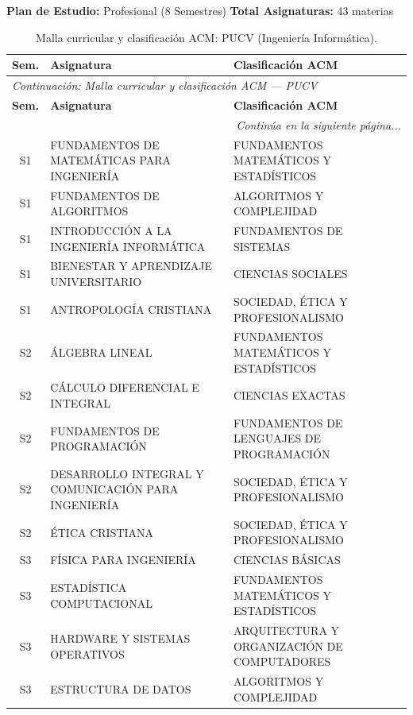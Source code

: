\documentclass[11pt,a4paper]{article}
\begin{document}
\noindent\textbf{Plan de Estudio:} Profesional (8 Semestres) \hfill \textbf{Total Asignaturas:} 43 materias

\vspace{4pt}

\begin{small}
\begin{longtable}{c >{\raggedright\arraybackslash}p{8.5cm} >{\raggedright\arraybackslash}p{5.5cm}}
\caption{Malla curricular y clasificación ACM: PUCV (Ingeniería Informática).} \label{tab:PUCV09} \\
\toprule
\textbf{Sem.} & \textbf{Asignatura} & \textbf{Clasificación ACM} \\
\midrule
\endfirsthead
\multicolumn{3}{l}{\small\textit{Continuación: Malla curricular y clasificación ACM --- PUCV}} \\[3pt]
\toprule
\textbf{Sem.} & \textbf{Asignatura} & \textbf{Clasificación ACM} \\
\midrule
\endhead
\midrule
\multicolumn{3}{r}{\small\textit{Continúa en la siguiente página...}} \\
\endfoot
\bottomrule
\endlastfoot
S1 & FUNDAMENTOS DE MATEMÁTICAS PARA INGENIERÍA & FUNDAMENTOS MATEMÁTICOS Y ESTADÍSTICOS \\
S1 & FUNDAMENTOS DE ALGORITMOS & ALGORITMOS Y COMPLEJIDAD \\
S1 & INTRODUCCIÓN A LA INGENIERÍA INFORMÁTICA & FUNDAMENTOS DE SISTEMAS \\
S1 & BIENESTAR Y APRENDIZAJE UNIVERSITARIO & CIENCIAS SOCIALES \\
S1 & ANTROPOLOGÍA CRISTIANA & SOCIEDAD, ÉTICA Y PROFESIONALISMO \\
S2 & ÁLGEBRA LINEAL & FUNDAMENTOS MATEMÁTICOS Y ESTADÍSTICOS \\
S2 & CÁLCULO DIFERENCIAL E INTEGRAL & CIENCIAS EXACTAS \\
S2 & FUNDAMENTOS DE PROGRAMACIÓN & FUNDAMENTOS DE LENGUAJES DE PROGRAMACIÓN \\
S2 & DESARROLLO INTEGRAL Y COMUNICACIÓN PARA INGENIERÍA & SOCIEDAD, ÉTICA Y PROFESIONALISMO \\
S2 & ÉTICA CRISTIANA & SOCIEDAD, ÉTICA Y PROFESIONALISMO \\
S3 & FÍSICA PARA INGENIERÍA & CIENCIAS BÁSICAS \\
S3 & ESTADÍSTICA COMPUTACIONAL & FUNDAMENTOS MATEMÁTICOS Y ESTADÍSTICOS \\
S3 & HARDWARE Y SISTEMAS OPERATIVOS & ARQUITECTURA Y ORGANIZACIÓN DE COMPUTADORES \\
S3 & ESTRUCTURA DE DATOS & ALGORITMOS Y COMPLEJIDAD \\

\end{longtable}
\end{small}
\end{document}
